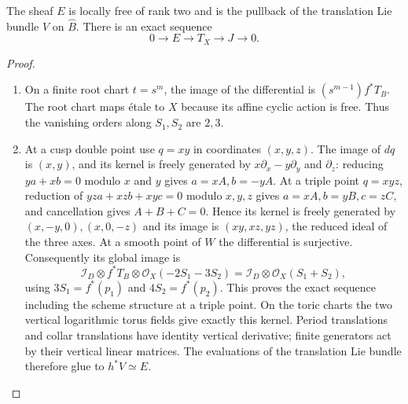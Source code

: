 \begin{theorem}\label{night:P5.1}\label{stmt:P5.1}

The sheaf $E$ is locally free of rank two and is the pullback of the
translation Lie bundle $V$ on $\widehat B$.  There is an exact sequence
\begin{equation}\label{eq:P5tangent}
 0\longrightarrow E\longrightarrow T_X\longrightarrow J\longrightarrow0.
\end{equation}
\end{theorem}
\begin{proof}
\begin{enumerate}[label=\arabic*.,leftmargin=*]
\item On a finite root chart $t=s^m$, the image of the differential is
$(s^{m-1})f^*T_B$.  The root chart maps étale to $X$ because its affine
cyclic action is free.  Thus the vanishing orders along $S_1,S_2$ are
$2,3$.

\item At a cusp double point use $q=xy$ in coordinates $(x,y,z)$.  The image of
$dq$ is $(x,y)$, and its kernel is freely generated by
$x\partial_x-y\partial_y$ and $\partial_z$: reducing $ya+xb=0$ modulo
$x$ and $y$ gives $a=xA,b=-yA$.  At a triple point $q=xyz$, reduction of
$yz a+xz b+xy c=0$ modulo $x,y,z$ gives
$a=xA,b=yB,c=zC$, and cancellation gives $A+B+C=0$.  Hence its kernel is
freely generated by $(x,-y,0),(x,0,-z)$ and its image is
$(xy,xz,yz)$, the reduced ideal of the three axes.  At a smooth point of
$W$ the differential is surjective.  Consequently its global image is
\[
 \mathcal I_D\otimes f^*T_B\otimes\mathcal O_X(-2S_1-3S_2)
 =\mathcal I_D\otimes\mathcal O_X(S_1+S_2),
\]
using $3S_1=f^*(p_1)$ and $4S_2=f^*(p_2)$.  This proves the exact sequence
including the scheme structure at a triple point.  On the toric charts
the two vertical logarithmic torus fields give exactly this kernel.
Period translations and collar translations have identity vertical
derivative; finite generators act by their vertical linear matrices.
The evaluations of the translation Lie bundle therefore glue to
$h^*V\simeq E$.
\end{enumerate}
\end{proof}

